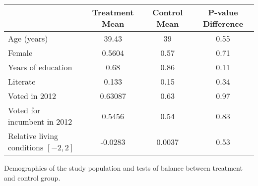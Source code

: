 
    \begin{center}
    \begin{tabular}{l c c c}
    \hline
    &Treatment Mean&Control Mean&P-value Difference\\
    \hline
    Age (years)&39.43&39&0.55\\
    Female&0.5604&0.57&0.71\\
    Years of education&0.68&0.86&0.11\\
    Literate&0.133&0.15&0.34\\
    Voted in 2012&0.63087&0.63&0.97\\
    Voted for incumbent in 2012&0.5456&0.54&0.83\\
    Relative living conditions $[-2,2]$&-0.0283&0.0037&0.53\\
    \hline\hline
    \end{tabular}
    \end{center}
    \caption{Demographics of the study population and tests of balance between treatment and control group. }
    
